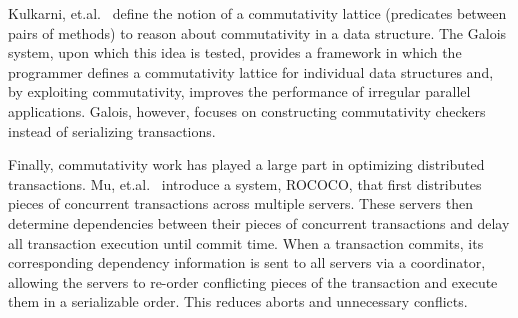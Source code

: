 Kulkarni, et.al.~\cite{galois} define the notion of a commutativity lattice (predicates between pairs of methods) to reason about commutativity in a data structure. The Galois system, upon which this idea is tested, provides a framework in which the programmer defines a commutativity lattice for individual data structures and, by exploiting commutativity, improves the performance of irregular parallel applications. Galois, however, focuses on constructing commutativity checkers instead of serializing transactions.

Finally, commutativity work has played a large part in optimizing distributed transactions. Mu, et.al.~\cite{distributed} introduce a system, ROCOCO, that first distributes pieces of concurrent transactions across multiple servers. These servers then determine dependencies between their pieces of concurrent transactions and delay all transaction execution until commit time. When a transaction commits, its corresponding dependency information is sent to all servers via a coordinator, allowing the servers to re-order conflicting pieces of the transaction and execute them in a serializable order. This reduces aborts and unnecessary conflicts.
